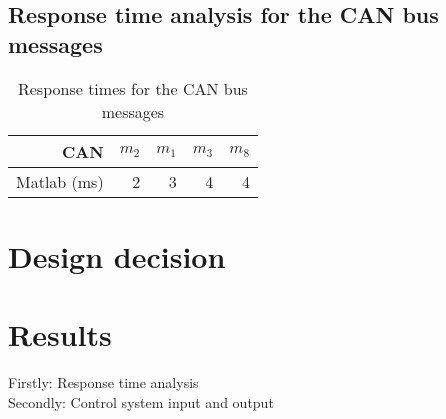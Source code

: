 \subsection{ Response time analysis for the CAN bus messages}

\begin{table}[htbp]
	\centering
	\caption{Response times for the CAN bus messages}
	\begin{tabular}{rrrrr}
		\toprule
		CAN     & $m_2$   & $m_1$   & $m_3$   & $m_8$ \\
		\midrule
		Matlab (ms) & 2       & 3       & 4       & 4 \\
		
	\end{tabular}%
	\label{tab:can-rt}%
\end{table}%




\section{Design decision}

\section{Results}
Firstly: Response time analysis\\
Secondly: Control system input and output










%


